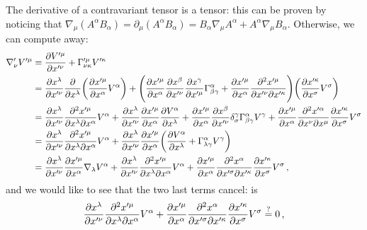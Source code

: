 \documentclass[main.tex]{subfiles}
\begin{document}
The derivative of a contravariant tensor is a tensor: this can be proven by noticing that \(\nabla_\mu (A^{\alpha }B_{\alpha }) = \partial_\mu (A^{\alpha }B_{\alpha }) = B_{\alpha } \nabla_{\mu }A^{\alpha } + A^{\alpha }\nabla_{\mu }B_{\alpha }\). Otherwise, we can compute away:
%
\begin{subequations}
\begin{align}
  \nabla_{\nu }' V^{\prime \mu }  &= \pdv{V^{\prime \mu }}{x^{\prime \nu }} + \Gamma^{\prime \mu }_{\nu \kappa }V^{\prime \kappa }  \\
  &= \pdv{x^{\lambda }}{x^{\prime \nu }} \pdv{}{x^{\lambda }} \qty(\pdv{x^{\prime \mu }}{x^{\alpha }} V^{\alpha }) 
  +   \qty(\pdv{x^{\prime \mu }}{x^{\alpha }} \pdv{x^{\beta }}{x^{\prime \nu }} \pdv{x^{\gamma }}{x^{\prime \mu }} \Gamma^{\alpha }_{\beta \gamma } 
  + \pdv{x^{\prime \mu }}{x^{\alpha }} \pdv[2]{x^{\prime \mu }}{x^{\prime \nu }}{x^{\prime \kappa }}) \qty(\pdv{x^{\prime \kappa }}{x^{\sigma }} V^{\sigma })  \\
  &= \pdv{x^{\lambda }}{x^{\prime \nu }} \pdv[2]{x^{\prime \mu }}{x^{\lambda }}{x^{\alpha }} V^{\alpha }
  + \pdv{x^{\lambda }}{x^{\prime \nu }} \pdv{x^{\prime \mu }}{x^{\alpha }} \pdv{V^{\alpha }}{x^{\lambda }}
  + \pdv{x^{\prime \mu }}{x^{\alpha }} \pdv{x^{\beta }}{x^{\prime \nu }} \delta^{\gamma}_{\sigma } \Gamma^{\alpha }_{\beta \gamma } V^{\gamma }+ \pdv{x^{\prime \mu }}{x^{\alpha }} \pdv[2]{x^{\prime \alpha }}{x^{\nu }}{x^{\mu }} \pdv{x^{\prime \kappa }}{x^{\sigma}} V^{\sigma }    \\
  &= \pdv{x^{\lambda }}{x^{\prime \nu }} \pdv[2]{x^{\prime \mu }}{x^{\lambda }}{x^{\alpha }} V^{\alpha }
  + \pdv{x^{\lambda }}{x^{\prime \nu }} \pdv{x^{\prime \mu }}{x^{\alpha }} \qty(\pdv{V^{\alpha }}{x^{\lambda }} + \Gamma^{\alpha }_{\lambda \gamma } V^{\gamma })  \\
  & = \pdv{x^{\lambda }}{x^{\prime \nu }} \pdv{x^{\prime \mu }}{x^{\alpha }} \nabla_{\lambda }V^{\alpha }
  + \pdv{x^{\lambda }}{x^{\prime \nu }} \pdv[2]{x^{\prime \mu }}{x^{\lambda }}{x^{\alpha }}V^{\alpha }
  + \pdv{x^{\prime \mu }}{x^{\alpha }} \pdv[2]{x^{ \alpha }}{x^{\prime \sigma }}{x^{\prime \kappa }} \pdv{x^{\prime \kappa }}{x^{ \sigma }} V^{\sigma }  
  \,,
\end{align}
\end{subequations}
%
and we would like to see that the two last terms cancel: is 
%
\begin{equation}
    \pdv{x^{\lambda }}{x^{\prime \nu }} \pdv[2]{x^{\prime \mu }}{x^{\lambda }}{x^{\alpha }}V^{\alpha }
    + \pdv{x^{\prime \mu }}{x^{\alpha }} \pdv[2]{x^{ \alpha }}{x^{\prime \sigma }}{x^{\prime \kappa }} \pdv{x^{\prime \kappa }}{x^{ \sigma }} V^{\sigma }  \overset{?}{=} 0 
\,,
\end{equation}
\end{document}
